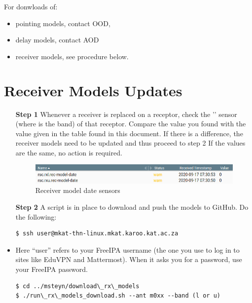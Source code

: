 For donwloads of:
\begin{itemize}
	
\item pointing models, contact OOD,
\item delay models, contact AOD 
\item receiver models, see procedure below.
\end{itemize}
\section{ Receiver Models Updates}
\begin{itemize}
	

\item[\textbf{Step 1}] Whenever a receiver is replaced on a receptor, check the '' sensor (where  is the band) of that receptor. Compare the value you found with the value given in the table found in this document. If there is a difference, the receiver models need to be updated and thus proceed to step 2 If the values are the same, no action is required.


\begin{figure}[!thb]
	\centering
	\includegraphics[scale=0.5]{Chapters/images/image77.png}
	
	\caption{Receiver model date sensors}
	\label{fig:image77}
\end{figure}

\item[\textbf{Step 2}] A script is in place to download and push the models to GitHub. Do the following:
\begin{lstlisting}[style=DOS]
$ ssh user@mkat-thn-linux.mkat.karoo.kat.ac.za 

\end{lstlisting}

	

\item Here “user” refers to your FreeIPA username (the one you use to log in to sites like EduVPN and Mattermost). When it asks you for a password, use your FreeIPA password.
\begin{lstlisting}[style=DOS]
$ cd ../msteyn/download\_rx\_models
$ ./run\_rx\_models_download.sh --ant m0xx --band (l or u)


\end{lstlisting}
\end{itemize}
